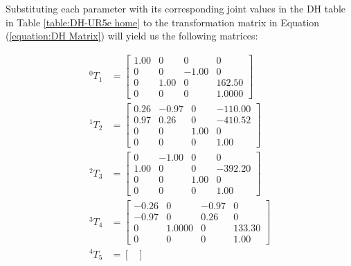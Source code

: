 Substituting each parameter with its corresponding joint values in the DH table in Table \ref{table:DH-UR5e home} to the transformation matrix in Equation (\ref{equation:DH Matrix}) will yield us the following matrices:

\begin{equation*}
    \begin{split}
        ^{0}T_{1} & = \begin{bmatrix}
                          1.00 & 0    & 0     & 0      \\
                          0    & 0    & -1.00 & 0      \\
                          0    & 1.00 & 0     & 162.50 \\
                          0    & 0    & 0     & 1.0000
                      \end{bmatrix}    \\
        ^{1}T_{2} & = \begin{bmatrix}
                          0.26 & -0.97 & 0    & -110.00 \\
                          0.97 & 0.26  & 0    & -410.52 \\
                          0    & 0     & 1.00 & 0       \\
                          0    & 0     & 0    & 1.00
                      \end{bmatrix}   \\
        ^{2}T_{3} & = \begin{bmatrix}
                          0    & -1.00 & 0    & 0       \\
                          1.00 & 0     & 0    & -392.20 \\
                          0    & 0     & 1.00 & 0       \\
                          0    & 0     & 0    & 1.00
                      \end{bmatrix}   \\
        ^{3}T_{4} & = \begin{bmatrix}
                          -0.26 & 0      & -0.97 & 0      \\
                          -0.97 & 0      & 0.26  & 0      \\
                          0     & 1.0000 & 0     & 133.30 \\
                          0     & 0      & 0     & 1.00
                      \end{bmatrix} \\
        ^{4}T_{5} & = \begin{bmatrix}

\end{bmatrix}
\end{split}
\end{equation*}
